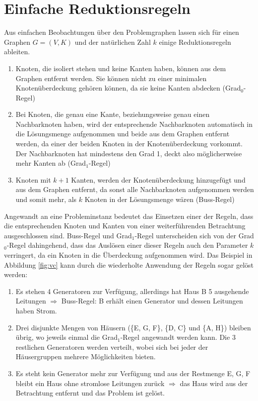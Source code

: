 \section{Einfache Reduktionsregeln}
\label{ch:Grundlagen:sec:Einfache Reduktionsregeln}
Aus einfachen Beobachtungen über den Problemgraphen lassen sich für einen Graphen $G=(V,K)$ und der natürlichen Zahl $k$ einige Reduktionsregeln ableiten.
\begin{enumerate}
\item Knoten, die isoliert stehen und keine Kanten haben, können aus dem Graphen entfernt werden. Sie können nicht zu einer minimalen Knotenüberdeckung gehören können, da sie keine Kanten abdecken (Grad$_{0}$-Regel)
\item Bei Knoten, die genau eine Kante, beziehungsweise genau einen Nachbarknoten haben, wird der entsprechende Nachbarknoten automatisch in die Lösungsmenge aufgenommen und beide aus dem Graphen entfernt werden, da einer der beiden Knoten in der Knotenüberdeckung vorkommt. Der Nachbarknoten hat mindestens den Grad 1, deckt also möglicherweise mehr Kanten ab (Grad$_{1}$-Regel)
\item Knoten mit $k+1$ Kanten, werden der Knotenüberdeckung hinzugefügt und aus dem Graphen entfernt, da sonst alle Nachbarknoten aufgenommen werden und somit mehr, als $k$ Knoten in der Lösungsmenge wären (Buss-Regel)
\end{enumerate}
Angewandt an eine Probleminstanz bedeutet das Einsetzen einer der Regeln, dass die entsprechenden Knoten und Kanten von einer weiterführenden Betrachtung ausgeschlossen sind. Buss-Regel und Grad$_{1}$-Regel unterscheiden sich von der Grad$_{0}$-Regel dahingehend, dass das Auslösen einer dieser Regeln auch den Parameter $k$ verringert, da ein Knoten in die Überdeckung aufgenommen wird.
Das Beispiel in Abbildung \ref{fig:vc} kann durch die wiederholte Anwendung der Regeln sogar gelöst werden:
\begin{enumerate}
\item Es stehen 4 Generatoren zur Verfügung, allerdings hat Haus B 5 ausgehende Leitungen $\Rightarrow$ Buss-Regel: B erhält einen Generator und dessen Leitungen haben Strom.
\item Drei disjunkte Mengen von Häusern (\{E, G, F\}, \{D, C\} und \{A, H\}) bleiben übrig, wo jeweils einmal die Grad$_{1}$-Regel angewandt werden kann. Die 3 restlichen Generatoren werden verteilt, wobei sich bei jeder der Häusergruppen mehrere Möglichkeiten bieten.
\item Es steht kein Generator mehr zur Verfügung und aus der Restmenge {E, G, F} bleibt ein Haus ohne stromlose Leitungen zurück $\Rightarrow$ das Haus wird aus der Betrachtung entfernt und das Problem ist gelöst.
\end{enumerate}
